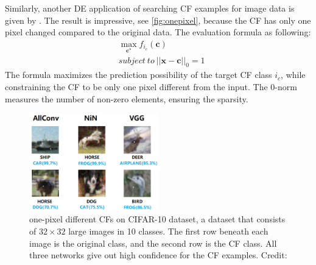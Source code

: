Similarly, another DE application of searching CF examples for image data is given by \citeauthor{onePixel} \cite{onePixel}. The result is impressive, see \autoref{fig:onepixel}, because the CF has only one pixel changed compared to the original data. The evaluation formula as following:
\begin{equation}\label{eq:onepixel}
  \begin{split}
     &\max_{\mathbf c^\star} f_{i_c}(\mathbf{c})\\
     &subject\ to\ ||\mathbf{x-c}||_0=1
  \end{split}
\end{equation}
The formula maximizes the prediction possibility of the target CF class $i_c$, while constraining the CF to be only one pixel different from the input. The 0-norm measures the number of non-zero elements, ensuring the sparsity.
\begin{figure}
  \centering
  \includegraphics[width=0.5\textwidth]{onepixel.PNG}
  \caption{one-pixel different CFs on CIFAR-10 dataset, a dataset that consists of $32\times32$ large images in 10 classes.
  The first row beneath each image is the original class, and the second row is the CF class. All three networks give out high confidence for the CF examples. Credit: \cite{onePixel}
  }
  \label{fig:onepixel}
\end{figure}

